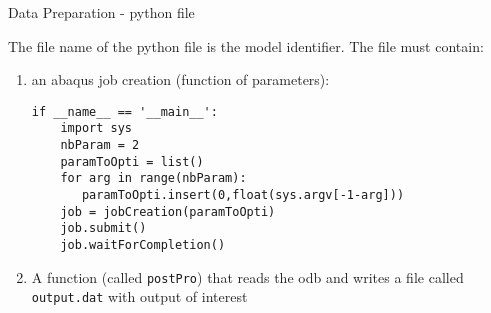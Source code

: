\begin{frame}[fragile]{Data Preparation - python file}

The file name of the python file is the model {\color{red} identifier}.
The file must contain:
\begin{enumerate}
\item an abaqus job creation (function of parameters):
\begin{verbatim}
if __name__ == '__main__':
    import sys
    nbParam = 2
    paramToOpti = list()
    for arg in range(nbParam):
       paramToOpti.insert(0,float(sys.argv[-1-arg]))
    job = jobCreation(paramToOpti) 
    job.submit()
    job.waitForCompletion()
\end{verbatim}
\item A function  (called \texttt{postPro}) that reads the odb and writes a file called
    \texttt{output.dat} with output of interest
\end{enumerate}
\end{frame}